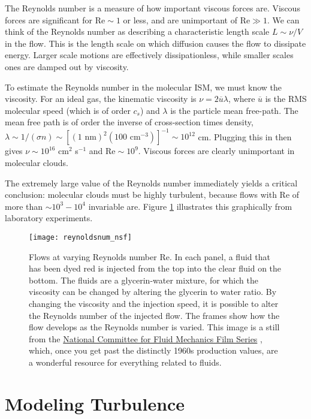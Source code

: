 The Reynolds number is a measure of how important viscous forces are. Viscous forces are significant for $\mathrm{Re} \sim 1$ or less, and are unimportant of $\mathrm{Re} \gg 1$. We can think of the Reynolds number as describing a characteristic length scale $L\sim \nu/V$ in the flow. This is the length scale on which diffusion causes the flow to dissipate energy. Larger scale motions are effectively dissipationless, while smaller scales ones are damped out by viscosity.

To estimate the Reynolds number in the molecular ISM, we must know the viscosity. For an ideal gas, the kinematic viscosity is $\nu=2\overline{u}\lambda$, where $\overline{u}$ is the RMS molecular speed (which is of order $c_s$) and $\lambda$ is the particle mean free-path. The mean free path is of order the inverse of cross-section times density, $\lambda \sim 1/(\sigma n) \sim [(1\mbox{ nm})^2 (100\mbox { cm}^{-3})]^{-1}\sim 10^{12}$ cm. Plugging this in then gives 
$\nu \sim 10^{16}$ cm$^2$ s$^{-1}$ and $\mathrm{Re} \sim 10^9$. Viscous forces are clearly unimportant in molecular clouds.

The extremely large value of the Reynolds number immediately yields a critical conclusion: molecular clouds must be highly turbulent, because flows with $\mathrm{Re}$ of more than $\sim 10^3-10^4$ invariable are. Figure \ref{fig:reynoldsnum_nsf} illustrates this graphically from laboratory experiments.

\begin{figure}
\texttt{[image: reynoldsnum\_nsf]}
\caption[Comparison of Flows at Varying Reynolds Numbers]{
\label{fig:reynoldsnum_nsf}
Flows at varying Reynolds number Re. In each panel, a fluid that has been dyed red is injected from the top into the clear fluid on the bottom. The fluids are a glycerin-water mixture, for which the viscosity can be changed by altering the glycerin to water ratio. By changing the viscosity and the injection speed, it is possible to alter the Reynolds number of the injected flow. The frames show how the flow develops as the Reynolds number is varied. This image is a still from the \href{https://www.youtube.com/playlist?list=PL0EC6527BE871ABA3}{National Committee for Fluid Mechanics Film Series}  \citep{taylor64a}, which, once you get past the distinctly 1960s production values, are a wonderful resource for everything related to fluids.
}
\end{figure}

\section{Modeling Turbulence}

